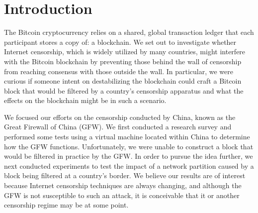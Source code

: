 \section{Introduction}
The Bitcoin cryptocurrency relies on a shared, global transaction ledger that each participant stores a copy of: a blockchain. We set out to investigate whether Internet censorship, which is widely utilized by many countries, might interfere with the Bitcoin blockchain by preventing those behind the wall of censorship from reaching consensus with those outside the wall. In particular, we were curious if someone intent on destabilizing the blockchain could craft a Bitcoin block that would be filtered by a country's censorship apparatus and what the effects on the blockchain might be in such a scenario.

We focused our efforts on the censorship conducted by China, known as the Great Firewall of China (GFW). We first conducted a research survey and performed some tests using a virtual machine located within China to determine how the GFW functions. Unfortunately, we were unable to construct a block that would be filtered in practice by the GFW. In order to pursue the idea further, we next conducted experiments to test the impact of a network partition caused by a block being filtered at a country's border. We believe our results are of interest because Internet censorship techniques are always changing, and although the GFW is not susceptible to such an attack, it is conceivable that it or another censorship regime may be at some point.